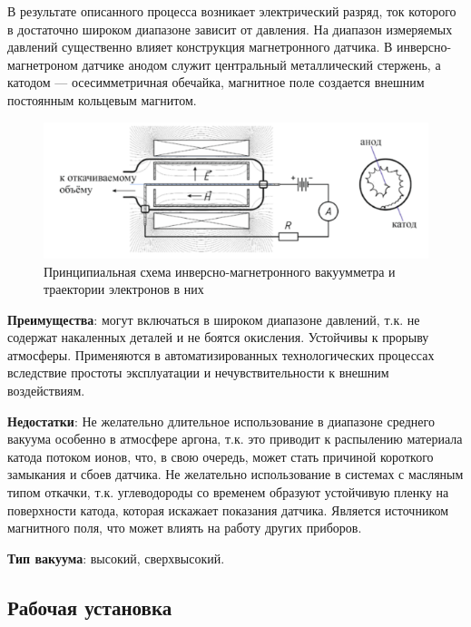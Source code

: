 \documentclass[a4paper, 12pt]{article} %
\begin{document}
В результате описанного процесса возникает электрический разряд, ток которого в достаточно широком диапазоне зависит от давления.
На диапазон измеряемых давлений существенно влияет конструкция магнетронного датчика. В инверсно-магнетроном датчике анодом служит центральный металлический стержень, а катодом — осесимметричная
обечайка, магнитное поле создается внешним постоянным кольцевым
магнитом.

\begin{figure}[h]
    \centering
    \includegraphics[width = 13 cm]{6}
    \caption{Принципиальная схема инверсно-магнетронного вакуумметра и траектории электронов в них}
    \label{fig:vac}
\end{figure}

\textbf{Преимущества}: могут включаться в широком диапазоне давлений, т.к. не содержат накаленных деталей и не боятся окисления. Устойчивы к прорыву атмосферы. Применяются в автоматизированных технологических процессах вследствие простоты эксплуатации
и нечувствительности к внешним воздействиям.

\textbf{Недостатки}: Не желательно длительное использование в диапазоне среднего вакуума особенно в атмосфере аргона, т.к. это приводит к распылению материала катода потоком ионов, что, в свою очередь, может стать причиной короткого замыкания и сбоев датчика. Не желательно использование в системах с масляным типом откачки, т.к. углеводороды со временем образуют устойчивую пленку на поверхности катода, которая искажает показания датчика. Является источником магнитного поля, что может влиять на работу других приборов.

\textbf{Тип вакуума}: высокий, сверхвысокий.

\subsection{Рабочая установка}
\end{document}
